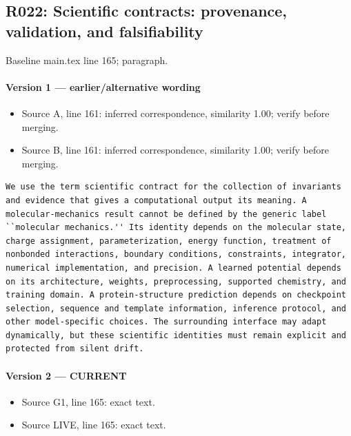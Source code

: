 \documentclass[11pt]{article}
\begin{document}
\subsection{R022: Scientific contracts: provenance, validation, and falsifiability}

Baseline main.tex line 165; paragraph.

\paragraph{Version 1 --- earlier/alternative wording}

\begin{itemize}[leftmargin=*]
\item Source A, line 161: inferred correspondence, similarity 1.00; verify before merging.
\item Source B, line 161: inferred correspondence, similarity 1.00; verify before merging.
\end{itemize}

\begin{lstlisting}
We use the term scientific contract for the collection of invariants and evidence that gives a computational output its meaning. A molecular-mechanics result cannot be defined by the generic label ``molecular mechanics.'' Its identity depends on the molecular state, charge assignment, parameterization, energy function, treatment of nonbonded interactions, boundary conditions, constraints, integrator, numerical implementation, and precision. A learned potential depends on its architecture, weights, preprocessing, supported chemistry, and training domain. A protein-structure prediction depends on checkpoint selection, sequence and template information, inference protocol, and other model-specific choices. The surrounding interface may adapt dynamically, but these scientific identities must remain explicit and protected from silent drift.
\end{lstlisting}

\paragraph{Version 2 --- CURRENT}

\begin{itemize}[leftmargin=*]
\item Source G1, line 165: exact text.
\item Source LIVE, line 165: exact text.
\end{itemize}
\end{document}
